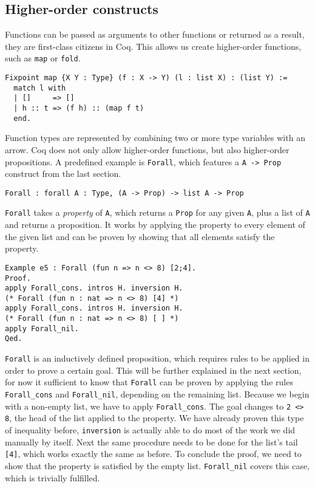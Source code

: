 \documentclass[fleqn]{scrreprt}
\newcommand{\todo}[1]{\marginpar{\textbf{TODO:} #1}}
\newcommand{\coqinline}[1]{\texttt{#1}}
\begin{document}
\subsection{Higher-order constructs}
Functions can be passed as arguments to other functions or returned as a result, they are first-class citizens in Coq. This allows us create higher-order functions, such as \coqinline{map} or \coqinline{fold}.
\todo{minted bug?}
\begin{verbatim}
Fixpoint map {X Y : Type} (f : X -> Y) (l : list X) : (list Y) :=
  match l with
  | []     => []
  | h :: t => (f h) :: (map f t)
  end.
\end{verbatim}
Function types are represented by combining two or more type variables with an arrow. Coq does not only allow higher-order functions, but also higher-order propositions. A predefined example is \coqinline{Forall}, which features a \coqinline{A -> Prop} construct from the last section.
\begin{verbatim}
Forall : forall A : Type, (A -> Prop) -> list A -> Prop
\end{verbatim}
\coqinline{Forall} takes a \textit{property} of \coqinline{A}, which returns a \coqinline{Prop} for any given \coqinline{A}, plus a list of \coqinline{A} and returns a proposition. It works by applying the property to every element of the given list and can be proven by showing that all elements satisfy the property.
\begin{verbatim}
Example e5 : Forall (fun n => n <> 8) [2;4].
Proof.
apply Forall_cons. intros H. inversion H.
(* Forall (fun n : nat => n <> 8) [4] *)
apply Forall_cons. intros H. inversion H.
(* Forall (fun n : nat => n <> 8) [ ] *)
apply Forall_nil.
Qed.
\end{verbatim}
\coqinline{Forall} is an inductively defined proposition, which requires rules to be applied in order to prove a certain goal. This will be further explained in the next section, for now it sufficient to know that \coqinline{Forall} can be proven by applying the rules \coqinline{Forall_cons} and \coqinline{Forall_nil}, depending on the remaining list. Because we begin with a non-empty list, we have to apply \coqinline{Forall_cons}. The goal changes to \coqinline{2 <> 8}, the head of the list applied to the property. We have already proven this type of inequality before, \coqinline{inversion} is actually able to do most of the work we did manually by itself. Next the same procedure needs to be done for the list's tail \coqinline{[4]}, which works exactly the same as before. To conclude the proof, we need to show that the property is satisfied by the empty list. \coqinline{Forall_nil} covers this case, which is trivially fulfilled.
\end{document}
